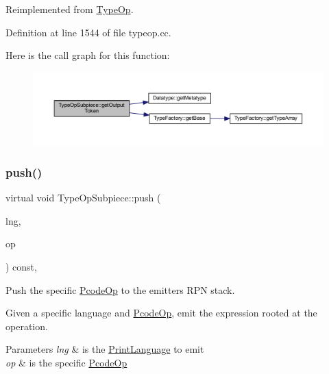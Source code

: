 Reimplemented from \mbox{\hyperlink{class_type_op_a7150ac93bb03a993735c829deb5237e7}{Type\+Op}}.



Definition at line 1544 of file typeop.\+cc.

Here is the call graph for this function\+:
\nopagebreak
\begin{figure}[H]
\begin{center}
\leavevmode
\includegraphics[width=350pt]{class_type_op_subpiece_ac93ca300b551f16888008869eca39150_cgraph}
\end{center}
\end{figure}
\mbox{\label{class_type_op_subpiece_a0ef689e39ee81e6c30f6d92a2024c4dd}} 
\subsubsection{\texorpdfstring{push()}{push()}}
{\footnotesize\ttfamily virtual void Type\+Op\+Subpiece\+::push (\begin{DoxyParamCaption}\item[{\mbox{\hyperlink{class_print_language}{Print\+Language}} $\ast$}]{lng,  }\item[{const \mbox{\hyperlink{class_pcode_op}{Pcode\+Op}} $\ast$}]{op }\end{DoxyParamCaption}) const\hspace{0.3cm}{\ttfamily [inline]}, {\ttfamily [virtual]}}



Push the specific \mbox{\hyperlink{class_pcode_op}{Pcode\+Op}} to the emitter\textquotesingle{}s R\+PN stack. 

Given a specific language and \mbox{\hyperlink{class_pcode_op}{Pcode\+Op}}, emit the expression rooted at the operation. 
\begin{DoxyParams}{Parameters}
{\em lng} & is the \mbox{\hyperlink{class_print_language}{Print\+Language}} to emit \\
\hline
{\em op} & is the specific \mbox{\hyperlink{class_pcode_op}{Pcode\+Op}} \\
\hline
\end{DoxyParams}



